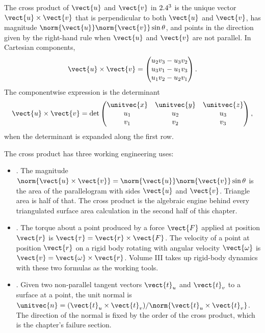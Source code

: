 The cross product of $\vect{u}$ and $\vect{v}$ in $2.4^{3}$ is the
unique vector $\vect{u} \times \vect{v}$ that is perpendicular to
both $\vect{u}$ and $\vect{v}$, has magnitude $\norm{\vect{u}}
\norm{\vect{v}} \sin\theta$, and points in the direction given by
the right-hand rule when $\vect{u}$ and $\vect{v}$ are not parallel.
In Cartesian components,
\[
\vect{u} \times \vect{v} =
\begin{pmatrix}
u_{2} v_{3} - u_{3} v_{2} \\
u_{3} v_{1} - u_{1} v_{3} \\
u_{1} v_{2} - u_{2} v_{1}
\end{pmatrix}.
\]
The componentwise expression is the determinant
\[
\vect{u} \times \vect{v} = \det
\begin{pmatrix}
\unitvec{x} & \unitvec{y} & \unitvec{z} \\
u_{1} & u_{2} & u_{3} \\
v_{1} & v_{2} & v_{3}
\end{pmatrix},
\]
when the determinant is expanded along the first row.

The cross product has three working engineering uses:

\begin{itemize}[leftmargin=*]
  \item {}. The magnitude
    $\norm{\vect{u} \times \vect{v}} = \norm{\vect{u}}\norm{\vect{v}}
    \sin\theta$ is the area of the parallelogram with sides $\vect{u}$
    and $\vect{v}$. Triangle area is half of that. The cross product
    is the algebraic engine behind every triangulated surface area
    calculation in the second half of this chapter.
  \item {}. The torque about a
    point produced by a force $\vect{F}$ applied at position
    $\vect{r}$ is $\vect{\tau} = \vect{r} \times \vect{F}$. The
    velocity of a point at position $\vect{r}$ on a rigid body
    rotating with angular velocity $\vect{\omega}$ is $\vect{v} =
    \vect{\omega} \times \vect{r}$. Volume III takes up rigid-body
    dynamics with these two formulas as the working tools.
  \item {}. Given two non-parallel tangent
    vectors $\vect{t}_{u}$ and $\vect{t}_{v}$ to a surface at a
    point, the unit normal is $\unitvec{n} = (\vect{t}_{u} \times
    \vect{t}_{v}) / \norm{\vect{t}_{u} \times \vect{t}_{v}}$. The
    direction of the normal is fixed by the order of the cross
    product, which is the chapter's failure section.
\end{itemize}

